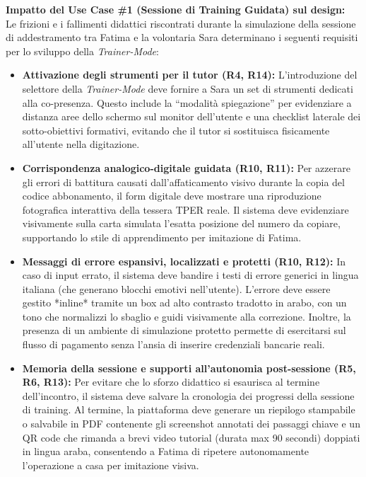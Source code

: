 \documentclass[11pt,a4paper]{article}
\begin{document}
\begin{center}
\begin{tcolorbox}[colback=backgroundColor,colframe=borderColor,arc=2mm]
    {\small
    \textbf{Impatto del Use Case \#1 (Sessione di Training Guidata) sul design:} \\[4pt]
    Le frizioni e i fallimenti didattici riscontrati durante la simulazione della sessione di addestramento tra Fatima e la volontaria Sara determinano i seguenti requisiti per lo sviluppo della \textit{Trainer-Mode}:
    \begin{itemize}[leftmargin=*]
        \item \textbf{Attivazione degli strumenti per il tutor (R4, R14):} L'introduzione del selettore della \textit{Trainer-Mode} deve fornire a Sara un set di strumenti dedicati alla co-presenza. Questo include la ``modalità spiegazione'' per evidenziare a distanza aree dello schermo sul monitor dell'utente e una checklist laterale dei sotto-obiettivi formativi, evitando che il tutor si sostituisca fisicamente all'utente nella digitazione.
        \item \textbf{Corrispondenza analogico-digitale guidata (R10, R11):} Per azzerare gli errori di battitura causati dall'affaticamento visivo durante la copia del codice abbonamento, il form digitale deve mostrare una riproduzione fotografica interattiva della tessera TPER reale. Il sistema deve evidenziare visivamente sulla carta simulata l'esatta posizione del numero da copiare, supportando lo stile di apprendimento per imitazione di Fatima.
        \item \textbf{Messaggi di errore espansivi, localizzati e protetti (R10, R12):} In caso di input errato, il sistema deve bandire i testi di errore generici in lingua italiana (che generano blocchi emotivi nell'utente). L'errore deve essere gestito *inline* tramite un box ad alto contrasto tradotto in arabo, con un tono che normalizzi lo sbaglio e guidi visivamente alla correzione. Inoltre, la presenza di un ambiente di simulazione protetto permette di esercitarsi sul flusso di pagamento senza l'ansia di inserire credenziali bancarie reali.
        \item \textbf{Memoria della sessione e supporti all'autonomia post-sessione (R5, R6, R13):} Per evitare che lo sforzo didattico si esaurisca al termine dell'incontro, il sistema deve salvare la cronologia dei progressi della sessione di training. Al termine, la piattaforma deve generare un riepilogo stampabile o salvabile in PDF contenente gli screenshot annotati dei passaggi chiave e un QR code che rimanda a brevi video tutorial (durata max 90 secondi) doppiati in lingua araba, consentendo a Fatima di ripetere autonomamente l'operazione a casa per imitazione visiva.
    \end{itemize}
    }
\end{tcolorbox}

\vspace{0.3cm}

\end{center}
\end{document}
